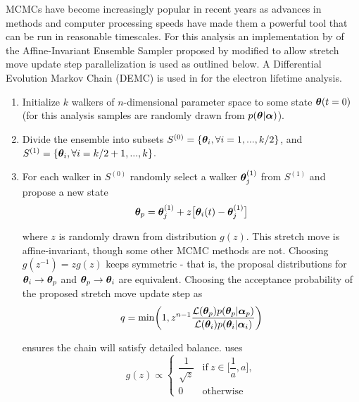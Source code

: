 MCMCs have become increasingly popular in recent years as advances in methods and computer processing speeds have made them
a powerful tool that can be run in reasonable timescales.  For this analysis an implementation by  of
the Affine-Invariant Ensemble Sampler proposed by  modified to allow stretch move update step parallelization is
used as outlined below.  A Differential Evolution Markov Chain (DEMC) is used in  for the electron
lifetime analysis.

\begin{enumerate}
\item Initialize $k$ walkers of $n$-dimensional parameter space to some state $\boldsymbol{\theta}(t = 0)$ (for this analysis samples are
randomly drawn from $p(\boldsymbol{\theta}|\boldsymbol{\alpha})$).

\item \label{itm:divide} Divide the ensemble into subsets $S^{(0)} = \{\boldsymbol{\theta}_i, \forall i = 1, . . ., k/2\}$, and
$S^{(1)} = \{\boldsymbol{\theta}_i, \forall i = k/2 + 1, . . ., k\}$.

\item \label{itm:newstate} For each walker in $S^{(0)}$ randomly select a walker $\boldsymbol{\theta}_j^{(1)}$ from $S^{(1)}$ and propose a new
state
\begin{equation}
\boldsymbol{\theta}_p = \boldsymbol{\theta}_j^{(1)} + z \big[ \boldsymbol{\theta}_i(t) - \boldsymbol{\theta}_j^{(1)} \big]
\label{eq:er_nr_calibrations_parameter_determ_mcmc_walker_update}
\end{equation}

\noindent where $z$ is randomly drawn from distribution $g(z)$. This stretch move is affine-invariant, though some other MCMC
methods are not.  Choosing
$g(z^{-1}) = z g(z)$ keeps  symmetric - that is, the proposal
distributions for $\boldsymbol{\theta}_i \rightarrow \boldsymbol{\theta}_p$ and $\boldsymbol{\theta}_p \rightarrow \boldsymbol{\theta}_i$ are
equivalent.  Choosing the
acceptance probability of the proposed stretch move update step as
\begin{equation}
q = \mathrm{min} \bigg( 1, z^{n - 1} \frac{\mathcal{L}(\boldsymbol{\theta}_p)p(\boldsymbol{\theta}_p|\boldsymbol{\alpha}_p)}
{\mathcal{L}(\boldsymbol{\theta}_i)p(\boldsymbol{\theta}_i|\boldsymbol{\alpha}_i)} \bigg)
\label{eq:er_nr_calibrations_parameter_determ_mcmc_prob}
\end{equation}

\noindent ensures the chain will satisfy detailed balance.   uses
\begin{equation}
g(z) \propto
\begin{cases}
\dfrac{1}{\sqrt{z}} & \mathrm{if}\ z \in \bigg[ \dfrac{1}{a}, a \bigg], \\
0 & \mathrm{otherwise}
\end{cases}
\end{equation}


\end{enumerate}

